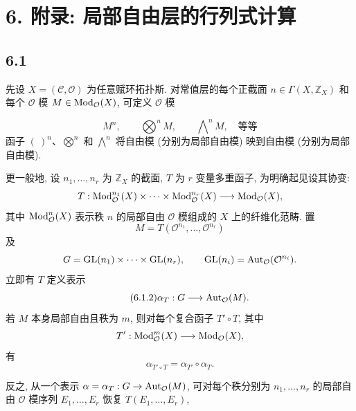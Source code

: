 \section*{6. 附录: 局部自由层的行列式计算}

\subsection*{6.1} 先设 $X=(\mathcal C,\mathcal O)$ 为任意赋环拓扑斯. 对常值层的每个正截面 $n\in\Gamma(X,\mathbb Z_X)$ 和每个 $\mathcal O$ 模 $M\in\operatorname{Mod}_{\mathcal O}(X)$, 可定义 $\mathcal O$ 模
%
%
%
%

\begin{equation}\tag{6.1.1}
M^n,\qquad \bigotimes\nolimits^n M,\qquad
\bigwedge\nolimits^n M,\quad\text{等等}
\end{equation}
函子 $(\ )^n$、$\bigotimes^n$ 和 $\bigwedge^n$ 将自由模 (分别为局部自由模) 映到自由模 (分别为局部自由模).
%
%

更一般地, 设 $n_1,\ldots,n_r$ 为 $\mathbb Z_X$ 的截面, $T$ 为 $r$ 变量多重函子, 为明确起见设其协变:
%
\[
T:\operatorname{Mod}_{\mathcal O}^{n_1}(X)\times\cdots\times
\operatorname{Mod}_{\mathcal O}^{n_r}(X)\longrightarrow\operatorname{Mod}_{\mathcal O}(X),
\]
其中 $\operatorname{Mod}_{\mathcal O}^n(X)$ 表示秩 $n$ 的局部自由 $\mathcal O$ 模组成的 $X$ 上的纤维化范畴. 置
%
\[
M=T(\mathcal O^{n_1},\ldots,\mathcal O^{n_r})
\]
及
\[
G=\operatorname{GL}(n_1)\times\cdots\times\operatorname{GL}(n_r),
\qquad
\operatorname{GL}(n_i)=\operatorname{Aut}_{\mathcal O}(\mathcal O^{n_i}).
\]
立即有 $T$ 定义表示
\begin{equation}\tag{6.1.2}
\alpha_T:G\longrightarrow\operatorname{Aut}_{\mathcal O}(M).
\end{equation}
若 $M$ 本身局部自由且秩为 $m$, 则对每个复合函子 $T'\circ T$, 其中
%
\[
T':\operatorname{Mod}_{\mathcal O}^m(X)\longrightarrow\operatorname{Mod}_{\mathcal O}(X),
\]
有
\begin{equation}\tag{6.1.3}
\alpha_{T'\circ T}=\alpha_{T'}\circ\alpha_T.
\end{equation}

反之, 从一个表示 $\alpha=\alpha_T:G\to\operatorname{Aut}_{\mathcal O}(M)$, 可对每个秩分别为 $n_1,\ldots,n_r$ 的局部自由 $\mathcal O$ 模序列 $E_1,\ldots,E_r$ 恢复 $T(E_1,\ldots,E_r)$,
%
%

